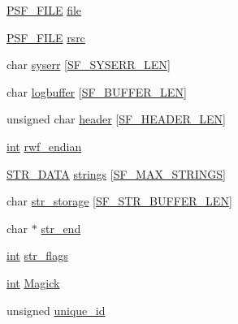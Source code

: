 \begin{DoxyCompactItemize}
\begin{tabbing}
\end{tabbing}\item 
\hyperlink{struct_p_s_f___f_i_l_e}{P\+S\+F\+\_\+\+F\+I\+LE} \hyperlink{structsf__private__tag_aba0363a05c5d908f7af983ca82a7b881}{file}
\item 
\hyperlink{struct_p_s_f___f_i_l_e}{P\+S\+F\+\_\+\+F\+I\+LE} \hyperlink{structsf__private__tag_ab48e56e819aa979392049439153314e6}{rsrc}
\item 
char \hyperlink{structsf__private__tag_ae421e30047accc95f5f0237b0988af87}{syserr} \mbox{[}\hyperlink{libsndfile_2src_2common_8h_a03f6d9e8dd724c1921bd5f8a4773acda}{S\+F\+\_\+\+S\+Y\+S\+E\+R\+R\+\_\+\+L\+EN}\mbox{]}
\item 
char \hyperlink{structsf__private__tag_a737949e51b02b0cf9fecd65b57071cf6}{logbuffer} \mbox{[}\hyperlink{libsndfile_2src_2common_8h_a9ad225cf481d61f73f54fd0ca9b9af08}{S\+F\+\_\+\+B\+U\+F\+F\+E\+R\+\_\+\+L\+EN}\mbox{]}
\item 
unsigned char \hyperlink{structsf__private__tag_a0cf96c0a7464d4333f992bdb5b0034c4}{header} \mbox{[}\hyperlink{libsndfile_2src_2common_8h_ad8d7831f52d709eefd2d69f69c50434a}{S\+F\+\_\+\+H\+E\+A\+D\+E\+R\+\_\+\+L\+EN}\mbox{]}
\item 
\hyperlink{xmltok_8h_a5a0d4a5641ce434f1d23533f2b2e6653}{int} \hyperlink{structsf__private__tag_ab48d569db130b1bad1afb8e9288aa0e8}{rwf\+\_\+endian}
\item 
\hyperlink{struct_s_t_r___d_a_t_a}{S\+T\+R\+\_\+\+D\+A\+TA} \hyperlink{structsf__private__tag_a65b23e105d51eaa8b0d8029a2e64d641}{strings} \mbox{[}\hyperlink{libsndfile_2src_2common_8h_abd03920bd79f3db0728bb0716e5e2c71}{S\+F\+\_\+\+M\+A\+X\+\_\+\+S\+T\+R\+I\+N\+GS}\mbox{]}
\item 
char \hyperlink{structsf__private__tag_ad4bab3e88a0122b384d6afb50380cd73}{str\+\_\+storage} \mbox{[}\hyperlink{libsndfile_2src_2common_8h_a85c95c1e3fa49db53d41aae1d6385bd7}{S\+F\+\_\+\+S\+T\+R\+\_\+\+B\+U\+F\+F\+E\+R\+\_\+\+L\+EN}\mbox{]}
\item 
char $\ast$ \hyperlink{structsf__private__tag_ab303ff13195dc67a711cc51f1cd9c11c}{str\+\_\+end}
\item 
\hyperlink{xmltok_8h_a5a0d4a5641ce434f1d23533f2b2e6653}{int} \hyperlink{structsf__private__tag_ad24506f93bce90fd79743e25f6aa9391}{str\+\_\+flags}
\item 
\hyperlink{xmltok_8h_a5a0d4a5641ce434f1d23533f2b2e6653}{int} \hyperlink{structsf__private__tag_af4d6ce187a60903a381d0b3a73c3daab}{Magick}
\item 
unsigned \hyperlink{structsf__private__tag_a28082288cf3d352df6db48cf98e84d61}{unique\+\_\+id}

\end{DoxyCompactItemize}
